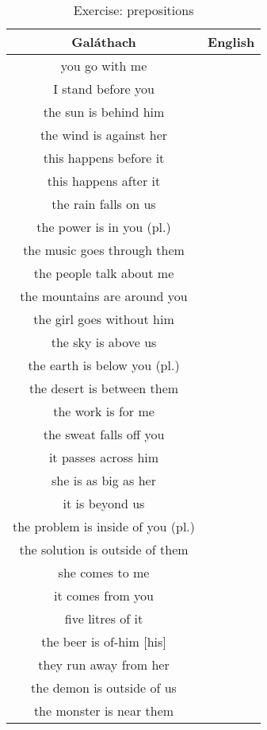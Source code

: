 \begin{table}[H]
\centering
\begin{tabu}{|c|M{5.0cm}|}
  \toprule
  \textbf{Gal\'{a}thach} & \textbf{English}\\
  \toprule
  you go with me & \\
  \midrule
  I stand before you & \\
  \midrule
  the sun is behind him & \\
  \midrule
  the wind is against her & \\
  \midrule
  this happens before it & \\
  \midrule
  this happens after it & \\
  \midrule
  the rain falls on us & \\
  \midrule
  the power is in you (pl.) & \\
  \midrule
  the music goes through them & \\
  \midrule
  the people talk about me & \\
  \midrule
  the mountains are around you & \\
  \midrule
  the girl goes without him & \\
  \midrule
  the sky is above us & \\
  \midrule
  the earth is below you (pl.) & \\
  \midrule
  the desert is between them & \\
  \midrule
  the work is for me & \\
  \midrule
  the sweat falls off you & \\
  \midrule
  it passes across him & \\
  \midrule
  she is as big as her & \\
  \midrule
  it is beyond us & \\
  \midrule
  the problem is inside of you (pl.) & \\
  \midrule
  the solution is outside of them & \\
  \midrule
  she comes to me & \\
  \midrule
  it comes from you & \\
  \midrule
  five litres of it & \\
  \midrule
  the beer is of-him $[$his$]$ & \\
  \midrule
  they run away from her & \\
  \midrule
  the demon is outside of us & \\
  \midrule
  the monster is near them & \\
  \bottomrule
\end{tabu}
\label{exercise_prepositions}
\caption{Exercise: prepositions}
\end{table}

